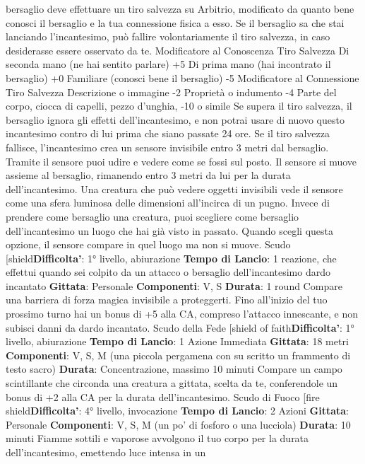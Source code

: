 \begin{multicols}{2}
bersaglio deve effettuare un tiro salvezza su Arbitrio,
modificato da quanto bene conosci il bersaglio e la tua
connessione fisica a esso. Se il bersaglio sa che stai
lanciando l’incantesimo, può fallire volontariamente il
tiro salvezza, in caso desiderasse essere osservato da
te.
Modificatore al
Conoscenza Tiro Salvezza
Di seconda mano (ne hai sentito parlare) +5
Di prima mano (hai incontrato il bersaglio) +0
Familiare (conosci bene il bersaglio) -5
Modificatore al
Connessione Tiro Salvezza
Descrizione o immagine -2
Proprietà o indumento -4
Parte del corpo, ciocca di capelli, pezzo d’unghia, -10
o simile
Se supera il tiro salvezza, il bersaglio ignora gli effetti
dell’incantesimo, e non potrai usare di nuovo questo
incantesimo contro di lui prima che siano passate 24
ore.
Se il tiro salvezza fallisce, l’incantesimo crea un
sensore invisibile entro 3 metri dal bersaglio. Tramite il
sensore puoi udire e vedere come se fossi sul posto. Il
sensore si muove assieme al bersaglio, rimanendo
entro 3 metri da lui per la durata dell’incantesimo. Una
creatura che può vedere oggetti invisibili vede il 
sensore come una sfera luminosa delle dimensioni
all’incirca di un pugno.
Invece di prendere come bersaglio una creatura, puoi
scegliere come bersaglio dell’incantesimo un luogo che
hai già visto in passato. Quando scegli questa opzione,
il sensore compare in quel luogo ma non si muove.
Scudo
[shield\textbf{Difficolta'}:
1° livello, abiurazione
\textbf{Tempo di Lancio}: 1 reazione, che effettui quando sei
colpito da un attacco o bersaglio dell’incantesimo dardo
incantato
\textbf{Gittata}: Personale
\textbf{Componenti}: V, S
\textbf{Durata}: 1 round
Compare una barriera di forza magica invisibile a
proteggerti. Fino all’inizio del tuo prossimo turno hai un
bonus di +5 alla CA, compreso l’attacco innescante, e
non subisci danni da dardo incantato.
Scudo della Fede
[shield of faith\textbf{Difficolta'}:
1° livello, abiurazione
\textbf{Tempo di Lancio}: 1 Azione Immediata
\textbf{Gittata}: 18 metri
\textbf{Componenti}: V, S, M (una piccola pergamena con su
scritto un frammento di testo sacro)
\textbf{Durata}: Concentrazione, massimo 10 minuti
Compare un campo scintillante che circonda una
creatura a gittata, scelta da te, conferendole un bonus
di +2 alla CA per la durata dell’incantesimo.
Scudo di Fuoco
[fire shield\textbf{Difficolta'}:
4° livello, invocazione
\textbf{Tempo di Lancio}: 2 Azioni
\textbf{Gittata}: Personale
\textbf{Componenti}: V, S, M (un po’ di fosforo o una lucciola)
\textbf{Durata}: 10 minuti
Fiamme sottili e vaporose avvolgono il tuo corpo per la
durata dell’incantesimo, emettendo luce intensa in un

\end{multicols}
